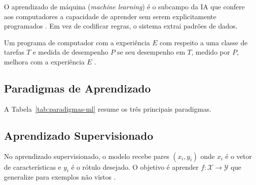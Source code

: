 O aprendizado de máquina (\textit{machine learning}) é o subcampo da IA que
confere aos computadores a capacidade de aprender sem serem explicitamente
programados \cite{bishop2006pattern, hastie2009elements}. Em vez de codificar
regras, o sistema extrai padrões de dados.
\begin{definicao}
Um programa de computador  com a experiência $E$ com
respeito a uma classe de tarefas $T$ e medida de desempenho $P$ se seu
desempenho em $T$, medido por $P$, melhora com a experiência $E$
\cite{mitchell1997machine, hastie2009elements}.
\end{definicao}
\subsection{Paradigmas de Aprendizado}
A Tabela~\ref{tab:paradigmas-ml} resume os três principais paradigmas.
\begin{table}[htb]
\centering
    \small
\caption{Paradigmas de Aprendizado de Máquina}
\label{tab:paradigmas-ml}
\end{table}
\subsection{Aprendizado Supervisionado}
No aprendizado supervisionado, o modelo recebe pares
$(x_i, y_i)$ onde $x_i$ é o vetor de características e $y_i$ é o rótulo
desejado. O objetivo é aprender $f: \mathcal{X} \to \mathcal{Y}$ que
generalize para exemplos não vistos \cite{hastie2009elements}.
